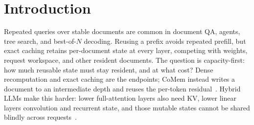 \documentclass{article}
\begin{document}
\section{Introduction}
\label{sec:intro}

Repeated queries over stable documents are common in document QA, agents, tree
search, and best-of-$N$ decoding.  Reusing a prefix avoids repeated prefill, but
exact caching retains per-document state at every layer, competing with weights,
request workspace, and other resident documents.  The question is capacity-first:
how much reusable state must stay resident, and at what cost?  Dense
recomputation and exact caching are the endpoints; CoMem instead writes a
document to an intermediate depth and
reuses the per-token residual~\citep{liu2026comem,liu2026understanding}.  Hybrid
LLMs make this harder: lower full-attention layers also need KV, lower linear
layers convolution and recurrent state, and those mutable states cannot be
shared blindly across requests~\citep{yang2025gateddeltanet,lieber2025jamba}.
\end{document}
